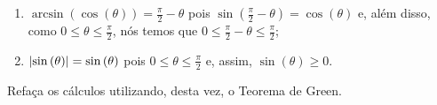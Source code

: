 \begin{enumerate}
  \item
    \(\arcsin{(\cos{(\theta)})}=\frac{\pi}{2}-\theta\) pois
    \(\sin{(\frac{\pi}{2}-\theta)}=\cos{(\theta)}\) e, além disso, como
    \(0\leqslant{\theta}\leqslant{\frac{\pi}{2}}\), nós temos que
    \(0\leqslant{\frac{\pi}{2}-\theta}\leqslant{\frac{\pi}{2}}\);
  \item
    \(\lvert\sin{(\theta)}\rvert=\sin{(\theta)}\) pois
    \(0\leqslant{\theta}\leqslant{\frac{\pi}{2}}\) e, assim,
    \(\sin{(\theta)}\geqslant{0}\).
\end{enumerate}

\begin{remark}
  Refaça os cálculos utilizando, desta vez, o Teorema de Green.
\end{remark}

